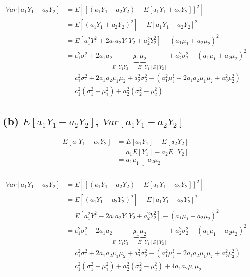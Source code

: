 \documentclass[
  letterpaper,
  DIV=11,
  numbers=noendperiod]{scrreprt}
\begin{document}
\[
\begin{aligned}
    Var[a_1 Y_1 + a_2 Y_2] &= E[ [(a_1 Y_1 + a_2 Y_2) - E[a_1 Y_1 + a_2 Y_2]]^{2}]\\
    &= E[(a_1 Y_1 + a_2 Y_2)^2] - E[a_1 Y_1 + a_2 Y_2]^2\\
    &= E[a_{1}^{2}Y_{1}^{2} + 2a_1 a_2 Y_1 Y_2 + a_{2}^{2}Y_{2}^{2}] - (a_1 \mu_1 + a_2 \mu_2)^2\\
    &= a^{2}_{1}\sigma^{2}_{1} + 2a_1 a_2 \underbrace{\mu_1 \mu_2}_{E[Y_1 Y_2]=E[Y_1]E[Y_2]} + a_{2}^{2}\sigma^{2}_{2} - (a_1 \mu_1 + a_2 \mu_2)^2\\
    &= a^{2}_{1}\sigma^{2}_{1} + 2a_1 a_2 \mu_1 \mu_2 + a_{2}^{2}\sigma^{2}_{2} - (a_{1}^{2}\mu_{1}^{2} + 2a_1 a_2 \mu_1 \mu_2 + a_{2}^{2}\mu_{2}^{2} )\\
    &= \underline{a_{1}^{2}(\sigma^{2}_{1} - \mu^{2}_{1}) + a_{2}^{2}(\sigma^{2}_{2} - \mu^{2}_{2})}
\end{aligned}
\]

\hypertarget{b-ea_1-y_1---a_2-y_2-vara_1-y_1---a_2-y_2}{%
\subsection{\texorpdfstring{(b) \(E[a_1 Y_1 - a_2 Y_2]\),
\(Var[a_1 Y_1 - a_2 Y_2]\)}{(b) E{[}a\_1 Y\_1 - a\_2 Y\_2{]}, Var{[}a\_1 Y\_1 - a\_2 Y\_2{]}}}\label{b-ea_1-y_1---a_2-y_2-vara_1-y_1---a_2-y_2}}

\[
\begin{aligned}
  E[a_1 Y_1 - a_2 Y_2] &= E[a_1 Y_1] - E[a_2 Y_2]\\
                       &= a_1 E[Y_1] - a_2 E[Y_2]\\
                       &= \underline{a_1 \mu_1 - a_2 \mu_{2}}\\
\end{aligned}
\]

\[
\begin{aligned}
    Var[a_1 Y_1 - a_2 Y_2] &= E[ [(a_1 Y_1 - a_2 Y_2) - E[a_1 Y_1 - a_2 Y_2]]^{2}]\\
    &= E[(a_1 Y_1 - a_2 Y_2)^2] - E[a_1 Y_1 - a_2 Y_2]^2\\
    &= E[a_{1}^{2}Y_{1}^{2} - 2a_1 a_2 Y_1 Y_2 + a_{2}^{2}Y_{2}^{2}] - (a_1 \mu_1 - a_2 \mu_2)^2\\
    &= a^{2}_{1}\sigma^{2}_{1} - 2a_1 a_2 \underbrace{\mu_1 \mu_2}_{E[Y_1 Y_2]=E[Y_1]E[Y_2]} + a_{2}^{2}\sigma^{2}_{2} - (a_1 \mu_1 - a_2 \mu_2)^2\\
    &= a^{2}_{1}\sigma^{2}_{1} + 2a_1 a_2 \mu_1 \mu_2 + a_{2}^{2}\sigma^{2}_{2} - (a_{1}^{2}\mu_{1}^{2} - 2a_1 a_2 \mu_1 \mu_2 + a_{2}^{2}\mu_{2}^{2} )\\
    &= \underline{a_{1}^{2}(\sigma^{2}_{1} - \mu^{2}_{1}) + a_{2}^{2}(\sigma^{2}_{2} - \mu^{2}_{2}) + 4a_1 a_2 \mu_1 \mu_2}
\end{aligned}
\]
\end{document}
